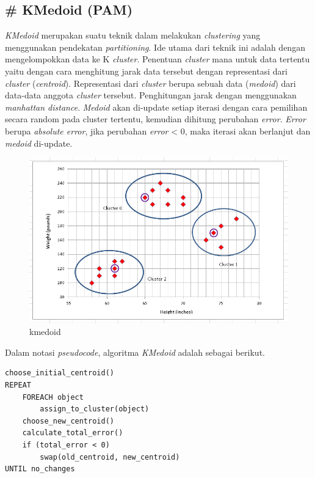 \documentclass[11pt]{article}
\makeatletter
\def\maxwidth{\ifdim\Gin@nat@width>\linewidth\linewidth
    \else\Gin@nat@width\fi}
\let\Oldincludegraphics\includegraphics
\renewcommand{\includegraphics}[1]{\Oldincludegraphics[width=.8\maxwidth]{#1}}
\makeatother
\begin{document}
    \subsection{\# KMedoid (PAM)}\label{kmedoid-pam}

\emph{KMedoid} merupakan suatu teknik dalam melakukan \emph{clustering}
yang menggunakan pendekatan \emph{partitioning}. Ide utama dari teknik
ini adalah dengan mengelompokkan data ke K \emph{cluster}. Penentuan
\emph{cluster} mana untuk data tertentu yaitu dengan cara menghitung
jarak data tersebut dengan representasi dari \emph{cluster}
(\emph{centroid}). Representasi dari \emph{cluster} berupa sebuah data
(\emph{medoid}) dari data-data anggota \emph{cluster} tersebut.
Penghitungan jarak dengan menggunakan \emph{manhattan distance}.
\emph{Medoid} akan di-update setiap iterasi dengan cara pemilihan secara
random pada cluster tertentu, kemudian dihitung perubahan \emph{error}.
\emph{Error} berupa \emph{absolute error}, jika perubahan \emph{error}
\textless{} 0, maka iterasi akan berlanjut dan \emph{medoid} di-update.

\begin{figure}[htbp]
\centering
\includegraphics{img/kmedoid.png}
\caption{kmedoid}
\end{figure}

Dalam notasi \emph{pseudocode}, algoritma \emph{KMedoid} adalah sebagai
berikut.

\begin{verbatim}
choose_initial_centroid()
REPEAT
    FOREACH object
        assign_to_cluster(object)
    choose_new_centroid()
    calculate_total_error()
    if (total_error < 0)
        swap(old_centroid, new_centroid)
UNTIL no_changes
\end{verbatim}
\end{document}
